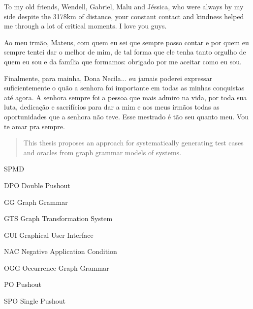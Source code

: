 \documentclass[ppgc,diss,english,openright]{iiufrgs}
\theoremstyle{plain}
\theoremstyle{definition}
\begin{document}
  To my old friends, Wendell, Gabriel, Malu and Jéssica, who were always by my side despite the 3178km of distance, your constant contact and kindness helped me through a lot of critical moments. I love you guys.

  Ao meu irmão, Mateus, com quem eu sei que sempre posso contar e por quem eu sempre tentei dar o melhor de mim, de tal forma que ele tenha tanto orgulho de quem eu sou e da família que formamos: obrigado por me aceitar como eu sou.
  
  Finalmente, para mainha, Dona Necila... eu jamais poderei expressar suficientemente o quão a senhora foi importante em todas as minhas conquistas até agora. A senhora sempre foi a pessoa que mais admiro na vida, por toda sua luta, dedicação e sacrifícios para dar a mim e aos meus irmãos todas as oportunidades que a senhora não teve. Esse mestrado é tão seu quanto meu. Vou te amar pra sempre.

\begin{abstract}
  This thesis proposes an approach for systematically generating test cases and oracles from graph grammar models of systems.
\end{abstract}

\begin{listofabbrv}{SPMD}
   \item[DPO] Double Pushout
   \item[GG] Graph Grammar
   \item[GTS] Graph Transformation System
   \item[GUI] Graphical User Interface
   \item[NAC] Negative Application Condition
   \item[OGG] Occurrence Graph Grammar
   \item[PO] Pushout
   \item[SPO] Single Pushout
\end{listofabbrv}


\listoffigures
\tableofcontents



%





\end{document}
